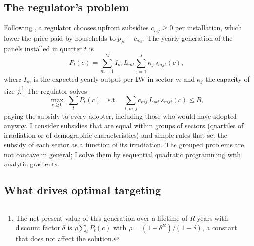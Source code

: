 \documentclass[final,3p,times,authoryear]{elsarticle}
\begin{document}
\subsection{The regulator's problem}

    Following \citet{feger2020pv_welfare}, a regulator chooses upfront subsidies $c_{mj} \geq 0$ per installation, which lower the price paid by households to $p_{jt} - c_{mj}$. The yearly generation of the panels installed in quarter $t$ is
    \begin{equation}
        P_{t}(c) = \sum_{m=1}^{M} I_{m}\, L_{mt} \sum_{j=1}^{J} \kappa_{j}\, s_{mjt}(c),
        \label{eq:elprod}
    \end{equation}
    where $I_m$ is the expected yearly output per kW in sector $m$ and $\kappa_j$ the capacity of size $j$.\footnote{The net present value of this generation over a lifetime of $R$ years with discount factor $\delta$ is $\rho \sum_t P_t(c)$ with $\rho = (1-\delta^{R})/(1-\delta)$, a constant that does not affect the solution.} The regulator solves
    \begin{equation}
        \max _{c \geq 0} \; \sum_{t} P_{t}(c) \quad \text{s.t.} \quad \sum_{t,m,j} c_{mj}\, L_{mt}\, s_{mjt}(c) \leq B,
        \label{eq:regulator}
    \end{equation}
    paying the subsidy to every adopter, including those who would have adopted anyway. I consider subsidies that are equal within groups of sectors (quartiles of irradiation or of demographic characteristics) and simple rules that set the subsidy of each sector as a function of its irradiation. The grouped problems are not concave in general; I solve them by sequential quadratic programming with analytic gradients.

\subsection{What drives optimal targeting}
\label{sec:mechanism}
\end{document}
